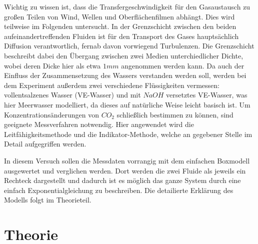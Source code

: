 \documentclass[12pt]{article}
\begin{document}
Wichtig zu wissen ist, dass die Transfergeschwindigkeit für den Gasaustausch zu großen Teilen von Wind, Wellen und Oberflächenfilmen abhängt. Dies wird teilweise im Folgenden untersucht. In der Grenzschicht zwischen den beiden aufeinandertreffenden Fluiden ist für den Transport des Gases hauptsächlich Diffusion verantwortlich, fernab davon vorwiegend Turbulenzen. Die Grenzschicht beschreibt dabei den Übergang zwischen zwei Medien unterchiedlicher Dichte, wobei deren Dicke hier als etwa $1 mm$ angenommen werden kann.
Da auch der Einfluss der Zusammensetzung des Wassers verstanden werden soll, werden bei dem Experiment außerdem zwei verschiedene Flüssigkeiten vermessen: vollentsalzenes Wasser (VE-Wasser) und mit $NaOH$ versetztes VE-Wasser, was hier Meerwasser modelliert, da dieses auf natürliche Weise leicht basisch ist. Um Konzentrationsänderungen von $CO_2$ schließlich bestimmen zu können, sind geeignete Messverfahren notwendig. Hier angewendet wird die Leitfähigkeitsmethode und die Indikator-Methode, welche an gegebener Stelle im Detail aufgegriffen werden. 

In diesem Versuch sollen die Messdaten vorrangig mit dem einfachen Boxmodell ausgewertet und verglichen werden. Dort werden die zwei Fluide als jeweils ein Rechteck dargestellt und dadurch ist es möglich das ganze System durch eine einfach Exponentialgleichung zu beschreiben. Die detailierte Erklärung des Modells folgt im Theorieteil.

\section{Theorie}\label{1}
\end{document}
